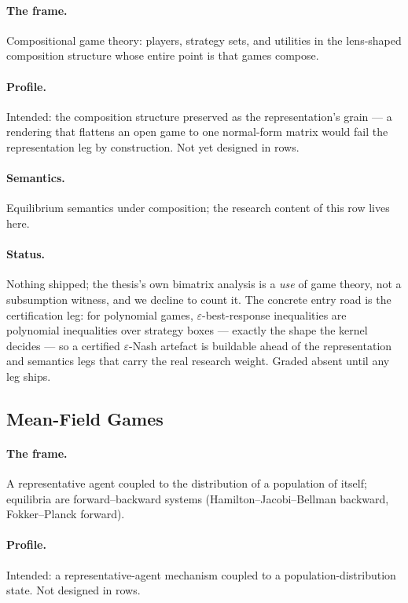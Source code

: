 \paragraph{The frame.} Compositional game theory: players, strategy
sets, and utilities in the lens-shaped composition structure whose
entire point is that games compose.

\paragraph{Profile.} Intended: the composition structure preserved
as the representation's grain --- a rendering that flattens an open
game to one normal-form matrix would fail the representation leg by
construction. Not yet designed in rows.

\paragraph{Semantics.} Equilibrium semantics under composition; the
research content of this row lives here.

\paragraph{Status.} Nothing shipped; the thesis's own bimatrix
analysis is a \emph{use} of game theory, not a subsumption witness,
and we decline to count it. The concrete entry road is the
certification leg: for polynomial games,
$\varepsilon$-best-response inequalities are polynomial inequalities
over strategy boxes --- exactly the shape the kernel decides --- so a
certified $\varepsilon$-Nash artefact is buildable ahead of the
representation and semantics legs that carry the real research
weight. Graded absent until any leg ships.

\subsection{Mean-Field Games}
\label{sec:mt-mfg}

\paragraph{The frame.} A representative agent coupled to the
distribution of a population of itself; equilibria are
forward--backward systems (Hamilton--Jacobi--Bellman backward,
Fokker--Planck forward).

\paragraph{Profile.} Intended: a representative-agent mechanism
coupled to a population-distribution state. Not designed in rows.

